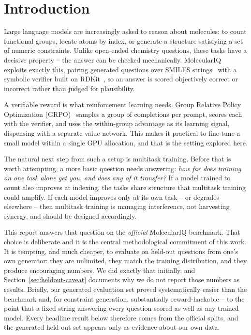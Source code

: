 \documentclass[a4paper,oneside,10pt,ngerman,english]{scrartcl}
\begin{document}

\cleardoubleoddpage

\section{Introduction}
\label{sec:introduction}

Large language models are increasingly asked to reason about molecules: to
count functional groups, locate atoms by index, or generate a structure
satisfying a set of numeric constraints. Unlike open-ended chemistry questions,
these tasks have a decisive property -- the answer can be checked mechanically.
MolecularIQ~\cite{bib:2024-moleculariq} exploits exactly this, pairing
generated questions over SMILES strings~\cite{bib:1988-weininger-smiles} with a
symbolic verifier built on RDKit~\cite{bib:rdkit}, so an answer is scored
objectively correct or incorrect rather than judged for plausibility.

A verifiable reward is what reinforcement learning needs. Group Relative Policy
Optimization (GRPO)~\cite{bib:2024-deepseekmath-grpo} samples a group of
completions per prompt, scores each with the verifier, and uses the
within-group advantage as its learning signal, dispensing with a separate value
network. This makes it practical to fine-tune a small model within a single GPU
allocation, and that is the setting explored here.

The natural next step from such a setup is multitask training. Before that is
worth attempting, a more basic question needs answering: \emph{how far does
training on one task alone get you, and does any of it transfer?} If a model
trained to count also improves at indexing, the tasks share structure that
multitask training could amplify. If each model improves only at its own task
-- or degrades elsewhere -- then multitask training is managing interference,
not harvesting synergy, and should be designed accordingly.

This report answers that question on the \emph{official} MolecularIQ benchmark.
That choice is deliberate and it is the central methodological commitment of
this work. It is tempting, and much cheaper, to evaluate on held-out questions
from one's own generator: they are unlimited, they match the training
distribution, and they produce encouraging numbers. We did exactly that
initially, and Section~\ref{sec:heldout-caveat} documents why we do not report
those numbers as results. Briefly, our generated evaluation set proved
systematically easier than the benchmark and, for constraint generation,
substantially reward-hackable -- to the point that a fixed string answering
every question scored as well as any trained model. Every headline result below
therefore comes from the official splits, and the generated held-out set
appears only as evidence about our own data.
\end{document}
